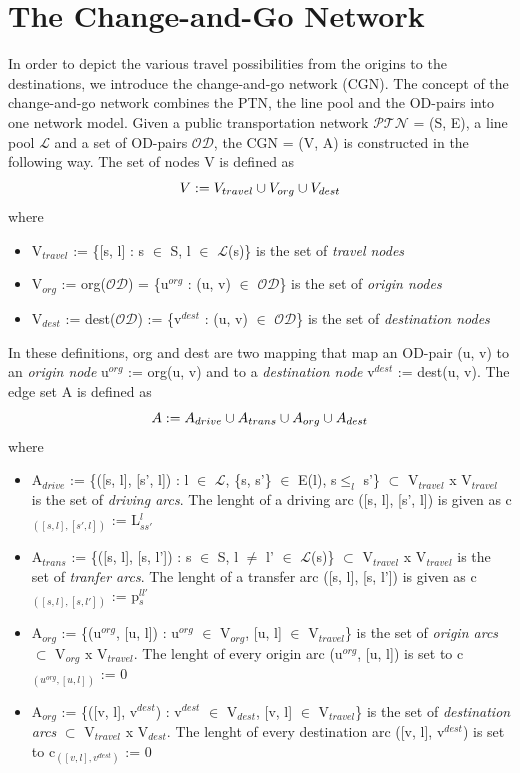 \documentclass[
  twoside,
  11pt, a4paper,
  footinclude=true,
  headinclude=true,
  cleardoublepage=empty
]{book}
\theoremstyle{definition}
\begin{document}
\section{The Change-and-Go Network}
In order to depict the various travel possibilities from the origins to the destinations, we introduce the change-and-go network (CGN). The concept of the change-and-go network combines the PTN, the line pool and the OD-pairs into one network model. \newline 
Given a public transportation network $\mathcal{PTN}$ = (S, E), a line pool $\mathcal{L}$ and a set of OD-pairs $\mathcal{OD}$, the CGN = (V, A) is constructed in the following way. \newline
The set of nodes V is defined as
\begin{equation} \notag
V := V_{travel} \cup V_{org} \cup V_{dest}
\end{equation}
where
\begin{itemize}
\item V$_{travel}$ := \{[s, l] : s $\in$ S, l $\in$ $\mathcal{L}$(s)\} is the set of \emph{travel nodes}
\item V$_{org}$ := org($\mathcal{OD}$) = \{u$^{org}$ : (u, v) $\in$ $\mathcal{OD}$\} is the set of \emph{origin nodes}
\item V$_{dest}$ := dest($\mathcal{OD}$) := \{v$^{dest}$ : (u, v) $\in$ $\mathcal{OD}$\} is the set of \emph{destination nodes}
\end{itemize}
In these definitions, org and dest are two mapping that map an OD-pair (u, v) to an \emph{origin node} u$^{org}$ := org(u, v) and to a \emph{destination node} v$^{dest}$ := dest(u, v). \newline
The edge set A is defined as
\begin{equation} \notag
A := A_{drive} \cup A_{trans} \cup A_{org} \cup A_{dest}
\end{equation}
where
\begin{itemize}
\item A$_{drive}$ := \{([s, l], [s', l]) : l $\in$ $\mathcal{L}$, \{s, s'\} $\in$ E(l), s$\le_{l}$ s'\} $\subset$ V$_{travel}$ x V$_{travel}$ is the set of \emph{driving arcs}. The lenght of a driving arc ([s, l], [s', l]) is given as c$_{([s, l], [s', l])}$ := L$^l_{ss'}$
\item A$_{trans}$ := \{([s, l], [s, l']) : s $\in$ S, l $\ne$ l' $\in$ $\mathcal{L}$(s)\} $\subset$ V$_{travel}$ x V$_{travel}$ is the set of \emph{tranfer arcs}. The lenght of a transfer arc ([s, l], [s, l'])  is given as c$_{([s, l], [s, l'])}$ := p$^{ll'}_s$
\item A$_{org}$ := \{(u$^{org}$, [u, l]) : u$^{org}$ $\in$  V$_{org}$, [u, l] $\in$ V$_{travel}$\} is the set of \emph{origin arcs} $\subset$ V$_{org}$ x V$_{travel}$. The lenght of every origin arc (u$^{org}$, [u, l]) is set to c$_{(u^{org}, [u, l])}$ := 0
\item A$_{org}$ := \{([v, l], v$^{dest}$) : v$^{dest}$ $\in$  V$_{dest}$, [v, l] $\in$ V$_{travel}$\} is the set of \emph{destination arcs} $\subset$ V$_{travel}$ x V$_{dest}$. The lenght of every destination arc ([v, l], v$^{dest}$) is set to c$_{([v, l], v^{dest})}$ := 0
\end{itemize} 
\end{document}
